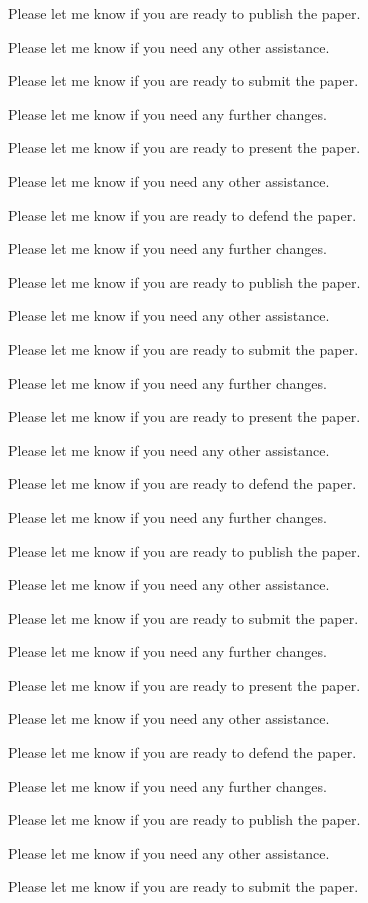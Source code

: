 Please let me know if you are ready to publish the paper. 

Please let me know if you need any other assistance. 

Please let me know if you are ready to submit the paper. 

Please let me know if you need any further changes. 

Please let me know if you are ready to present the paper. 

Please let me know if you need any other assistance. 

Please let me know if you are ready to defend the paper. 

Please let me know if you need any further changes. 

Please let me know if you are ready to publish the paper. 

Please let me know if you need any other assistance. 

Please let me know if you are ready to submit the paper. 

Please let me know if you need any further changes. 

Please let me know if you are ready to present the paper. 

Please let me know if you need any other assistance. 

Please let me know if you are ready to defend the paper. 

Please let me know if you need any further changes. 

Please let me know if you are ready to publish the paper. 

Please let me know if you need any other assistance. 

Please let me know if you are ready to submit the paper. 

Please let me know if you need any further changes. 

Please let me know if you are ready to present the paper. 

Please let me know if you need any other assistance. 

Please let me know if you are ready to defend the paper. 

Please let me know if you need any further changes. 

Please let me know if you are ready to publish the paper. 

Please let me know if you need any other assistance. 

Please let me know if you are ready to submit the paper. 

